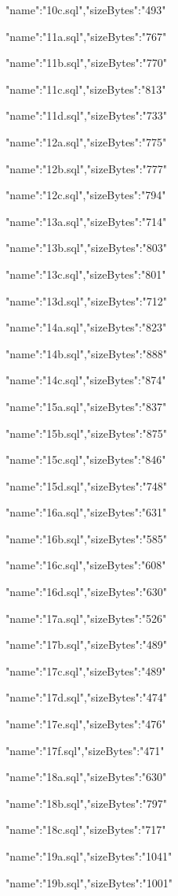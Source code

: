 \documentclass[11pt,a4paper]{article}
\begin{document}
{"name":"10c.sql","sizeBytes":"493"}

{"name":"11a.sql","sizeBytes":"767"}

{"name":"11b.sql","sizeBytes":"770"}

{"name":"11c.sql","sizeBytes":"813"}

{"name":"11d.sql","sizeBytes":"733"}

{"name":"12a.sql","sizeBytes":"775"}

{"name":"12b.sql","sizeBytes":"777"}

{"name":"12c.sql","sizeBytes":"794"}

{"name":"13a.sql","sizeBytes":"714"}

{"name":"13b.sql","sizeBytes":"803"}

{"name":"13c.sql","sizeBytes":"801"}

{"name":"13d.sql","sizeBytes":"712"}

{"name":"14a.sql","sizeBytes":"823"}

{"name":"14b.sql","sizeBytes":"888"}

{"name":"14c.sql","sizeBytes":"874"}

{"name":"15a.sql","sizeBytes":"837"}

{"name":"15b.sql","sizeBytes":"875"}

{"name":"15c.sql","sizeBytes":"846"}

{"name":"15d.sql","sizeBytes":"748"}

{"name":"16a.sql","sizeBytes":"631"}

{"name":"16b.sql","sizeBytes":"585"}

{"name":"16c.sql","sizeBytes":"608"}

{"name":"16d.sql","sizeBytes":"630"}

{"name":"17a.sql","sizeBytes":"526"}

{"name":"17b.sql","sizeBytes":"489"}

{"name":"17c.sql","sizeBytes":"489"}

{"name":"17d.sql","sizeBytes":"474"}

{"name":"17e.sql","sizeBytes":"476"}

{"name":"17f.sql","sizeBytes":"471"}

{"name":"18a.sql","sizeBytes":"630"}

{"name":"18b.sql","sizeBytes":"797"}

{"name":"18c.sql","sizeBytes":"717"}

{"name":"19a.sql","sizeBytes":"1041"}

{"name":"19b.sql","sizeBytes":"1001"}
\end{document}
